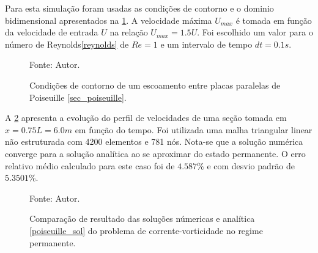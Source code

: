 Para esta simulação foram usadas as condições de contorno e o dominio bidimensional apresentados na \ref{poiseuille_bc}.
A velocidade máxima $U_{max}$ é tomada em função da velocidade de entrada $U$ na relação $U_{max}=1.5U$.
Foi escolhido um valor para o número de Reynolds\eqref{reynolds} de $Re=1$ e um intervalo de tempo $dt=0.1s$.
\begin{figure}[H]
    \centering
     {\raggedleft \scriptsize Fonte: Autor.}
    \caption{Condições de contorno de um escoamento entre placas paralelas de Poiseuille \ref{sec_poiseuille}.}
    \label{poiseuille_bc}
\end{figure}

A \ref{poiseuille_comp} apresenta a evolução do perfil de velocidades de uma seção tomada em $x=0.75L=6.0m$ em função do tempo.
Foi utilizada uma malha triangular linear não estruturada com 4200 elementos e 781 nós.
Nota-se que a solução numérica converge para a solução analítica ao se aproximar do estado permanente.
O erro relativo médio calculado para este caso foi de $4.587\%$ e com desvio padrão de $5.3501\%$.
\begin{figure}[H]
    \centering
     {\raggedleft \scriptsize Fonte: Autor.}
    \caption{Comparação de resultado das soluções númericas e analítica \ref{poiseuille_sol} do problema de corrente-vorticidade no regime permanente.}
    \label{poiseuille_comp}
\end{figure}

